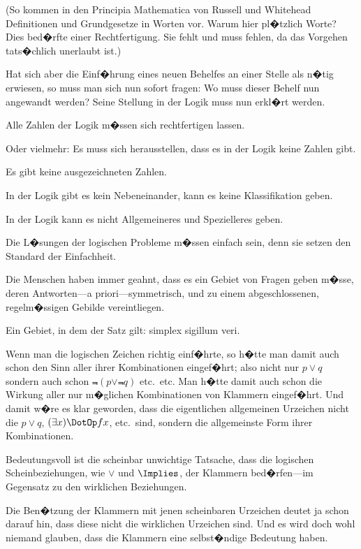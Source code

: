 \begin{propositions}
{(So kommen in den \glqq{}Principia Mathematica\grqq{}
von Russell und Whitehead Definitionen und
Grundgesetze in Worten vor. Warum hier pl�tzlich
Worte? Dies bed�rfte einer Rechtfertigung.
Sie fehlt und muss fehlen, da das Vorgehen tats�chlich
unerlaubt ist.)

Hat sich aber die Einf�hrung eines neuen
Behelfes an einer Stelle als n�tig erwiesen, so muss
man sich nun sofort fragen: Wo muss dieser
Behelf nun  angewandt werden? Seine
Stellung in der Logik muss nun erkl�rt werden.}


{Alle Zahlen der Logik m�ssen sich rechtfertigen
lassen.

Oder vielmehr: Es muss sich herausstellen,
dass es in der Logik keine Zahlen gibt.

Es gibt keine ausgezeichneten Zahlen.}


{In der Logik gibt es kein Nebeneinander, kann
es keine Klassifikation geben.

In der Logik kann es nicht Allgemeineres und
Spezielleres geben.}


{Die L�sungen der logischen Probleme m�ssen
einfach sein, denn sie setzen den Standard der
Einfachheit.

Die Menschen haben immer geahnt, dass es ein
Gebiet von Fragen geben m�sse, deren Antworten---a
priori---symmetrisch, und zu einem abgeschlossenen,
regelm�ssigen Gebilde vereintliegen.

Ein Gebiet, in dem der Satz gilt: simplex
sigillum veri.}


{Wenn man die logischen Zeichen richtig
einf�hrte, so h�tte man damit auch schon den Sinn
aller ihrer Kombinationen eingef�hrt; also nicht
nur \glqq{}$p \lor q$\grqq{} sondern auch schon \glqq{}$\Not{(p \lor \Not{q})}$\grqq{} etc.\ etc.
Man h�tte damit auch schon die Wirkung
aller nur m�glichen Kombinationen von Klammern
eingef�hrt. Und damit w�re es klar geworden,
dass die eigentlichen allgemeinen Urzeichen nicht
die \glqq{}$p \lor q$\grqq{}, \glqq{}$(\exists x) \DotOp fx$\grqq{}, etc.\ sind, sondern die allgemeinste
Form ihrer Kombinationen.}


{Bedeutungsvoll ist die scheinbar unwichtige
Tatsache, dass die logischen Scheinbeziehungen,
wie $\lor$ und $\Implies$, der Klammern be\-d�r\-fen---im Gegensatz
zu den wirklichen Beziehungen.

Die Ben�tzung der Klammern mit jenen scheinbaren
Urzeichen deutet ja schon darauf hin, dass
diese nicht die wirklichen Urzeichen sind. Und
es wird doch wohl niemand glauben, dass die
Klammern eine selbst�ndige Bedeutung haben.}



\end{propositions}

